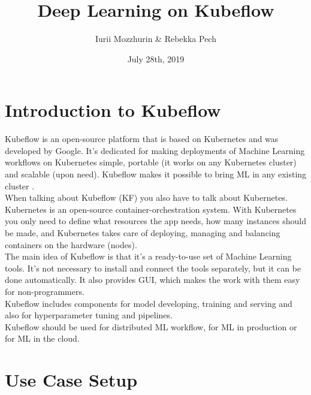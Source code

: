 \documentclass[
	12pt, %
]{fphw}
\title{Deep Learning on Kubeflow} %
\author{ Iurii Mozzhurin \& Rebekka Pech} %
\date{July 28th, 2019} %
\institute{Goethe University Frankfurt am Main}%
\begin{document}
\maketitle %


\vspace{80pt}

\section{Introduction to Kubeflow}

Kubeflow is an open-source platform that is based on Kubernetes and was developed by Google. It's dedicated for making deployments of Machine Learning workflows on Kubernetes simple, portable (it works on any Kubernetes cluster) and scalable (upon need). Kubeflow makes it possible to bring ML in any existing cluster \cite{kf}. \\

When talking about Kubeflow (KF) you also have to talk about Kubernetes. Kubernetes is an open-source container-orchestration system. With Kubernetes you only need to define what resources the app needs, how many instances should be made, and Kubernetes takes care of deploying, managing and balancing containers on the hardware (nodes).\\  

The main idea of Kubeflow is that it's a ready-to-use set of Machine Learning tools. It's not necessary to install and connect the tools separately, but it can be done automatically. It also provides GUI, which makes the work with them easy for non-programmers.\\

Kubeflow includes components for model developing, training and serving and also for hyperparameter tuning and pipelines.\\

Kubeflow should be used for distributed ML workflow, for ML in production or for ML in the cloud.
\ \\
\pagebreak
\section{Use Case Setup}
\end{document}
